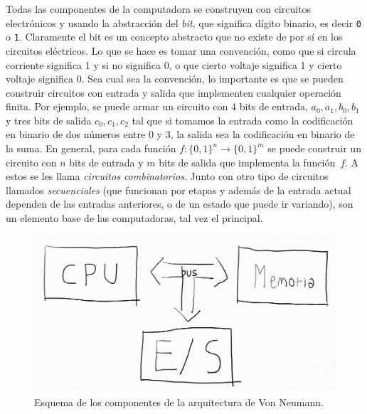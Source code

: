 \documentclass[a4paper, 12pt]{report}
\theoremstyle{definition}
\begin{document}
Todas las componentes de la computadora se construyen con circuitos electrónicos y usando la abstracción del {\sl bit}, que significa dígito binario, es decir {\tt 0} o {\tt 1}. Claramente el bit es un concepto abstracto que no existe de por sí en los circuitos eléctricos. Lo que se hace es tomar una convención, como que si circula corriente significa 1 y si no significa 0, o que cierto voltaje significa 1 y cierto voltaje significa 0. Sea cual sea la convención, lo importante es que se pueden construir circuitos con entrada y salida que implementen cualquier operación finita. Por ejemplo, se puede armar un circuito con 4 bits de entrada, $a_0,a_1,b_0,b_1$ y tres bits de salida $c_0,c_1,c_2$ tal que si tomamos la entrada como la codificación en binario de dos números entre $0$ y $3$, la salida sea la codificación en binario de la suma. En general, para cada función $f:\{0,1\}^n\to\{0,1\}^m$ se puede construir un circuito con $n$ bits de entrada y $m$ bits de salida que implementa la función~$f$. A estos se les llama {\sl circuitos combinatorios}. Junto con otro tipo de circuitos llamados {\sl secuenciales} (que funcionan por etapas y además de la entrada actual dependen de las entradas anteriores, o de un estado que puede ir variando), son un elemento base de las computadoras, tal vez el principal.




\begin{figure}
	\centering
	\includegraphics[scale=0.3]{ArqVN.png}
	\caption{Esquema de los componentes de la arquitectura de Von Neumann.}
	\label{fig-ArqVN}
\end{figure}
\end{document}
